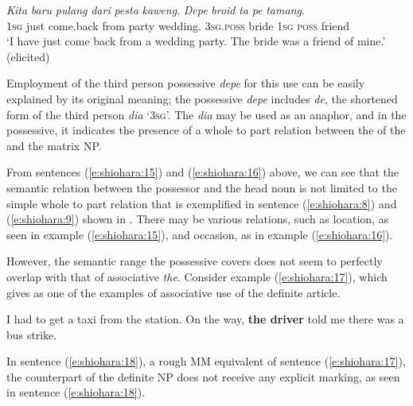 \documentclass[output=paper
,modfonts
,nonflat]{langsci/langscibook}
\begin{document}
\begin{exe}
	\ex\label{e:shiohara:16}
	\gll \textit{Kita} \textit{baru} \textit{pulang} \textit{dari} \textit{pesta} \textit{kaweng}. \textit{Depe} \textit{broid} \textit{ta} \textit{pe} \textit{tamang}.\\
	\textsc{1sg} just come.back from party wedding. \textsc{3sg}.\textsc{poss} bride \textsc{1sg} \textsc{poss} friend\\
	\glt ‘I have just come back from a wedding party. The bride was a friend of mine.’ \hfill{(elicited)}
\end{exe}

\noindent
Employment of the third person possessive \textit{depe} for this use can be easily explained by its original meaning; the possessive \textit{depe} includes \textit{de}, the shortened form of the third person  \textit{dia} ‘\textsc{3sg}’. The  \textit{dia} may be used as an anaphor, and in the possessive, it indicates the presence of a whole to part relation between the  of the  and the matrix NP.

From sentences (\ref{e:shiohara:15}) and (\ref{e:shiohara:16}) above, we can see that the semantic relation between the possessor and the head noun is not limited to the simple whole to part relation that is exemplified in sentence (\ref{e:shiohara:8}) and (\ref{e:shiohara:9}) shown in . There may be various relations, such as location, as seen in example (\ref{e:shiohara:15}), and occasion, as in example (\ref{e:shiohara:16}).

However, the semantic range the possessive covers does not seem to perfectly overlap with that of  associative \textit{the}. Consider example (\ref{e:shiohara:17}), which \citet[3]{Lyons1999} gives as one of the examples of associative use of the  definite article.

\begin{exe}
	\ex\label{e:shiohara:17} I had to get a taxi from the station. On the way, \textbf{the driver} told me there was a bus strike. 
\end{exe}

\noindent
In sentence (\ref{e:shiohara:18}), a rough MM equivalent of sentence (\ref{e:shiohara:17}), the counterpart of the  definite NP does not receive any explicit marking, as seen in sentence (\ref{e:shiohara:18}).
\end{document}
